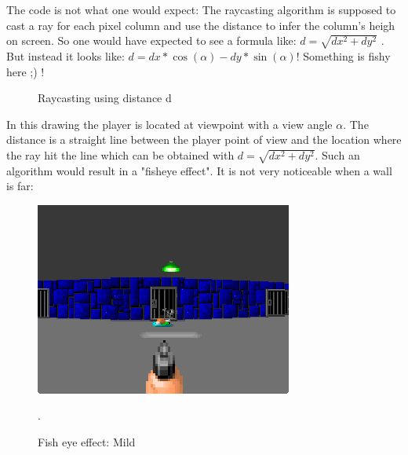 The code is not what one would expect: The raycasting algorithm is supposed to cast a ray for each pixel column and use the distance  to infer the column's heigh on screen. So one would have expected to see a formula like:
$ d = \sqrt{dx^2 + dy^2}$ . But instead it looks like: $d = dx * \cos(\alpha) - dy * \sin(\alpha) $! Something is fishy here ;) !\\
\par
\begin{figure}[H]
\centering
 
 \caption{Raycasting using distance d} \label{fig:Raycasting2}
\end{figure}

In this drawing the player is located at viewpoint with a view angle \begin{math}\alpha\end{math}. The distance  is a straight line between the player point of view and the location where the ray hit the line which can be obtained with $d = \sqrt{dx^2 + dy^2}$. Such an algorithm would result in a "fisheye effect". It is not very noticeable when a wall is far:

\begin{figure}[H]
\centering
 \includegraphics[width=\textwidth]{imgs/fish_eye/bad_mild.png}
 \caption{Fish eye effect: Mild}. \label{fig:mips}
 \end{figure}

